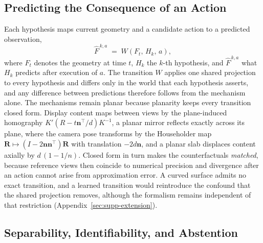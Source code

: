 \documentclass{article} %
\theoremstyle{defstyle}
\theoremstyle{plain}
\begin{document}
\subsection{Predicting the Consequence of an Action}
\label{sec:transition}

Each hypothesis maps current geometry and a candidate action to a predicted observation,
\begin{equation}
\label{eq:transition}
\hat{F}^{\,k,a} \;=\; W\!\left(F_t,\, H_k,\, a\right),
\end{equation}
where $F_t$ denotes the geometry at time $t$, $H_k$ the $k$-th hypothesis, and
$\hat{F}^{\,k,a}$ what $H_k$ predicts after execution of $a$. The transition $W$ applies
one shared projection to every hypothesis and differs only in the world that each
hypothesis asserts, and any difference between predictions therefore follows from the
mechanism alone. The mechanisms remain planar because planarity keeps every transition
closed form. Display content maps between views by the plane-induced homography
$K'(R - t\mathbf{n}^{\top}/d)K^{-1}$, a planar mirror reflects exactly across its plane,
where the camera pose transforms by the Householder map
$\mathbf{R} \mapsto (I - 2\mathbf{n}\mathbf{n}^{\top})\mathbf{R}$ with translation
$-2d\mathbf{n}$, and a planar slab displaces content axially by $d\,(1 - 1/n)$. Closed form
in turn makes the counterfactuals \emph{matched}, because reference views then coincide to
numerical precision and divergence after an action cannot arise from approximation error. A
curved surface admits no exact transition, and a learned transition would reintroduce the
confound that the shared projection removes, although the formalism remains independent of
that restriction (Appendix~\ref{sec:supp-extension}).

\subsection{Separability, Identifiability, and Abstention}
\label{sec:separability}
\end{document}
